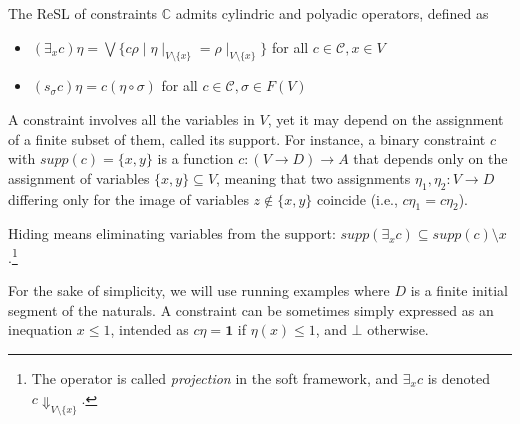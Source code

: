 \documentclass{llncs}
\def\monid{{\mathbf 0}}
\def\monid{\mathbf{1}}
\begin{document}
{\begin{lemma}
	The ReSL of constraints $\mathbb{C}$ admits cylindric and polyadic operators, defined as
	\begin{itemize}
		\item  $(\exists_x c) \eta = \bigvee \{c \rho \mid \eta\mid_{V \setminus \{x\}} = 
		\rho\mid_{V \setminus \{x\}}\}$ for all $c \in {\mathcal C}, x \in V$
		\item  $(s_\sigma c) \eta = c (\eta \circ \sigma)$ for all $c \in {\mathcal C}, \sigma \in F(V)$	
	\end{itemize}
\end{lemma}


A constraint involves all the variables in $V$, yet it may depend on
the assignment of a finite subset of them, called its support. For
instance, a binary constraint $c$ with $supp(c)=\{x,y\}$ is a function
$c: (V\rightarrow D)\rightarrow A$ that depends only on the
assignment of variables $\{x,y\}\subseteq V$, meaning that two
assignments $\eta_1, \eta_2: V \rightarrow D$ differing only for the
image of variables $z \not \in \{x,y\}$ coincide (i.e., $c\eta_1 =
c\eta_2$).
%


Hiding means eliminating variables from the support:
$supp(\exists_x c) \subseteq supp({c}) \setminus {x}$.\footnote{The operator
	is called \emph{projection} in the soft framework,
	and $\exists_x c$ is denoted $c\Downarrow_{V\setminus \{x\}}$.}
}

For the sake of simplicity, we will use running examples 
where 
$D$ is a finite initial segment of the naturals. 
A constraint can be sometimes simply expressed as an inequation $x \leq 1$, 
intended as $c\eta = \monid$ if $\eta(x) \leq 1$, and $\bot$ otherwise.
\end{document}

